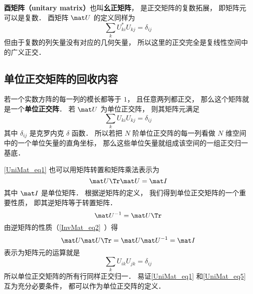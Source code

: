 
\begin{issues}
\issueDraft
{}
\end{issues}


\textbf{酉矩阵（unitary matrix）}也叫\textbf{幺正矩阵}， 是正交矩阵的复数拓展， 即矩阵元可以是复数． 酉矩阵 $\mat U$ 的定义同样为
\begin{equation}
\sum_k U_{ki}^* U_{kj} = \delta_{ij}
\end{equation}
但由于复数的列矢量没有对应的几何矢量， 所以这里的正交完全是复线性空间中的广义正交．


\subsection{单位正交矩阵的回收内容}


若一个实数方阵的每一列的模长都等于 $1$， 且任意两列都正交， 那么这个矩阵就是一个\textbf{单位正交阵}． 若 $\mat U$ 为单位正交阵， 则其矩阵元满足
\begin{equation}\label{UniMat_eq1}
\sum_k U_{ki} U_{kj} = \delta_{ij}
\end{equation}
其中 $\delta_{ij}$ 是克罗内克 $\delta$ 函数． 所以若把 $N$ 阶单位正交阵的每一列看做 $N$ 维空间中的一个单位矢量的直角坐标， 那么这些单位矢量就组成该空间的一组正交归一基底．

\autoref{UniMat_eq1} 也可以用矩阵转置和矩阵乘法表示为
\begin{equation}
\mat U\Tr \mat U = \mat I
\end{equation}
其中 $\mat I$ 是单位矩阵． 根据逆矩阵的定义， 我们得到单位正交矩阵的一个重要性质， 即其逆矩阵等于转置矩阵．
\begin{equation}\label{UniMat_eq2}
\mat U^{-1} = \mat U\Tr
\end{equation}
由逆矩阵的性质（\autoref{InvMat_eq2}~）得
\begin{equation}
\mat U \mat U\Tr = \mat U \mat U^{-1} = \mat I
\end{equation}
表示为矩阵元的运算就是
\begin{equation}\label{UniMat_eq5}
\sum_k U_{ik} U_{jk} = \delta_{ij}
\end{equation}
所以单位正交矩阵的所有行同样正交归一． 易证\autoref{UniMat_eq1} 和\autoref{UniMat_eq5} 互为充分必要条件， 都可以作为单位正交阵的定义．

